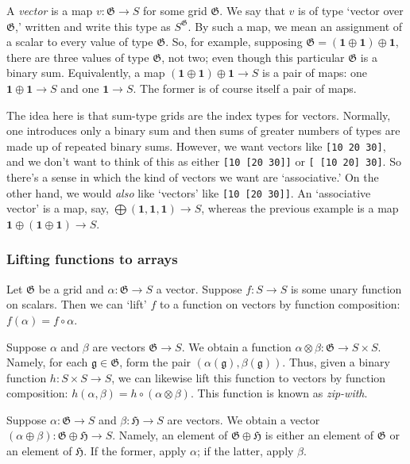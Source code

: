 \documentclass[11pt]{article}
\newcommand{\gr}[1]{\mathfrak{#1}}
\newcommand{\GG}{\gr{G}}
\newcommand{\unit}{\mathbf{1}}
\begin{document}
A \emph{vector} is a map \(v : \GG\to S\) for some grid \(\GG\). We say that \(v\) is of
type ‘vector over \(\GG\),’ written and write this type as \(S^\GG\). By such a map,
we mean an assignment of a scalar to every value of type \(\GG\). So, for example,
supposing \(\GG = (\unit\oplus\unit) \oplus \unit\), there are three values of
type \(\GG\), not two; even though this particular \(\GG\) is a binary
sum. Equivalently, a map \((\unit\oplus\unit) \oplus \unit\to S\) is a pair of
maps: one \(\unit\oplus\unit\to S\) and one \(\unit\to S\). The former is of course
itself a pair of maps.

The idea here is that sum-type grids are the index types for vectors. Normally,
one introduces only a binary sum and then sums of greater numbers of types are
made up of repeated binary sums. However, we want vectors like \texttt{[10 20 30]}, and
we don't want to think of this as either \texttt{[10 [20 30]]} or \texttt{[ [10 20] 30]}.  So
there's a sense in which the kind of vectors we want are ‘associative.’ On the
other hand, we would \emph{also} like ‘vectors’ like \texttt{[10 [20 30]]}. An ‘associative
vector’ is a map, say, \(\bigoplus(\unit, \unit, \unit)\to S\), whereas the
previous example is a map \(\unit\oplus (\unit\oplus \unit)\to S\).

\subsubsection{Lifting functions to arrays}
\label{sec:orgc0391ab}

Let \(\GG\) be a grid and \(\alpha:\GG\to S\) a vector. Suppose \(f:S\to S\) is some
unary function on scalars. Then we can ‘lift’ \(f\) to a function on vectors by
function composition: \(f(\alpha) = f\circ\alpha\).

Suppose \(\alpha\) and \(\beta\) are vectors \(\GG\to S\). We obtain a function
\(\alpha\otimes\beta : \GG\to S\times S\). Namely, for each \(\mathfrak{g}\in \GG\),
form the pair \((\alpha(\mathfrak{g}), \beta(\mathfrak{g}))\). Thus, given a
binary function \(h : S\times S\to S\), we can likewise lift this function to
vectors by function composition: \(h(\alpha, \beta) = h\circ
(\alpha\otimes\beta)\). This function is known as \emph{zip-with}.

Suppose \(\alpha : \gr{G}\to S\) and \(\beta : \gr{H}\to S\) are vectors. We obtain
a vector \((\alpha\oplus\beta) : \gr{G}\oplus\gr{H}\to S\). Namely, an element of
\(\gr{G}\oplus\gr{H}\) is either an element of \(\gr{G}\) or an element of
\(\gr{H}\). If the former, apply \(\alpha\); if the latter, apply \(\beta\). 
\end{document}
